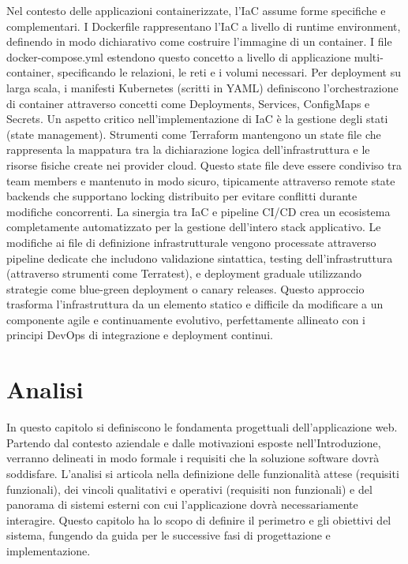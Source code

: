 \documentclass[12pt,a4paper,openright,twoside]{book}
\begin{document}
Nel contesto delle applicazioni containerizzate, l'IaC assume forme specifiche e complementari. I Dockerfile rappresentano l'IaC a livello di runtime environment, definendo in modo dichiarativo come costruire l'immagine di un container. I file docker-compose.yml estendono questo concetto a livello di applicazione multi-container, specificando le relazioni, le reti e i volumi necessari. Per deployment su larga scala, i manifesti Kubernetes (scritti in YAML) definiscono l'orchestrazione di container attraverso concetti come Deployments, Services, ConfigMaps e Secrets.
Un aspetto critico nell'implementazione di IaC è la gestione degli stati (state management). Strumenti come Terraform mantengono un state file che rappresenta la mappatura tra la dichiarazione logica dell'infrastruttura e le risorse fisiche create nei provider cloud. Questo state file deve essere condiviso tra team members e mantenuto in modo sicuro, tipicamente attraverso remote state backends che supportano locking distribuito per evitare conflitti durante modifiche concorrenti.
La sinergia tra IaC e pipeline CI/CD crea un ecosistema completamente automatizzato per la gestione dell'intero stack applicativo. Le modifiche ai file di definizione infrastrutturale vengono processate attraverso pipeline dedicate che includono validazione sintattica, testing dell'infrastruttura (attraverso strumenti come Terratest), e deployment graduale utilizzando strategie come blue-green deployment o canary releases. Questo approccio trasforma l'infrastruttura da un elemento statico e difficile da modificare a un componente agile e continuamente evolutivo, perfettamente allineato con i principi DevOps di integrazione e deployment continui.



\chapter{Analisi}
\label{chap:analisi}

In questo capitolo si definiscono le fondamenta progettuali dell'applicazione web. Partendo dal contesto aziendale e dalle motivazioni esposte nell'Introduzione, verranno delineati in modo formale i requisiti che la soluzione software dovrà soddisfare. L'analisi si articola nella definizione delle funzionalità attese (requisiti funzionali), dei vincoli qualitativi e operativi (requisiti non funzionali) e del panorama di sistemi esterni con cui l'applicazione dovrà necessariamente interagire. Questo capitolo ha lo scopo di definire il perimetro e gli obiettivi del sistema, fungendo da guida per le successive fasi di progettazione e implementazione.
\end{document}
